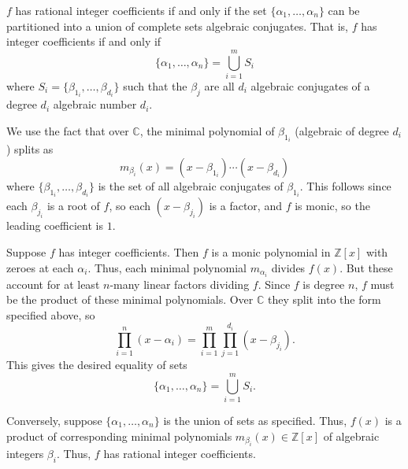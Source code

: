 \documentclass[12 pt, letterpaper]{hmcpset}
\begin{document}
\begin{solution}
	$f$ has rational integer coefficients if and only if the set $\{ \alpha_{1}, \dots, \alpha_{n} \}$ can be partitioned into a union of complete sets algebraic conjugates. That is, $f$ has integer coefficients if and only if
	\[
		\{ \alpha_{1}, \dots, \alpha_{n} \} = \bigcup_{i = 1}^{m} S_{i}
	\]
	where $S_{i} = \{ \beta_{1_{i}}, \dots, \beta_{d_{i}} \}$ such that the $\beta_{j}$ are all $d_{i}$ algebraic conjugates of a degree $d_{i}$ algebraic number $d_{i}$.

	We use the fact that over $\mathbb{C}$, the minimal polynomial of $\beta_{1_{i}}$ (algebraic of degree $d_{i}$) splits as
	\[
		m_{\beta_{i}}(x) = (x - \beta_{1_{i}}) \cdots (x - \beta_{d_{i}})
	\]
	where $\{ \beta_{1_{i}}, \dots, \beta_{d_{i}} \}$ is the set of all algebraic conjugates of $\beta_{1_{i}}$. This follows since each $\beta_{j_{i}}$ is a root of $f$, so each $(x - \beta_{j_{i}})$ is a factor, and $f$ is monic, so the leading coefficient is $1$.

	Suppose $f$ has integer coefficients. Then $f$ is a monic polynomial in $\mathbb{Z}[x]$ with zeroes at each $\alpha_{i}$. Thus, each minimal polynomial $m_{\alpha_{i}}$ divides $f(x)$. But these account for at least $n$-many linear factors dividing $f$. Since $f$ is degree $n$, $f$ must be the product of these minimal polynomials. Over $\mathbb{C}$ they split into the form specified above, so 
	\[
		\prod_{i = 1}^{n} (x - \alpha_{i}) = \prod_{i = 1}^{m} \prod_{j = 1}^{d_{i}} (x - \beta_{j_{i}}).
	\]
	This gives the desired equality of sets
	\[
		\{ \alpha_{1}, \dots, \alpha_{n} \} = \bigcup_{i = 1}^{m} S_{i}.
	\]

	Conversely, suppose $\{ \alpha_{1}, \dots, \alpha_{n} \}$ is the union of sets as specified. Thus, $f(x)$ is a product of corresponding minimal polynomials $m_{\beta_{i}}(x) \in \mathbb{Z}[x]$ of algebraic integers $\beta_{i}$. Thus, $f$ has rational integer coefficients.
\end{solution}
\end{document}
